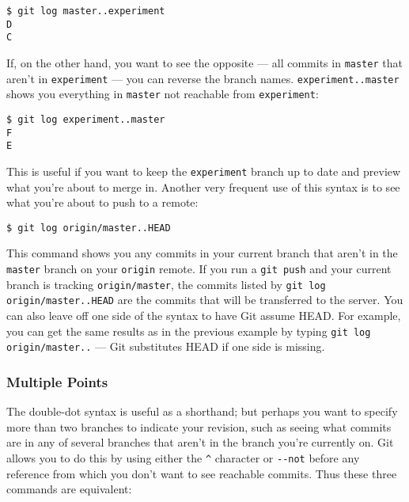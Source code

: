 \documentclass[a4paper]{book}
\begin{document}
\begin{shaded}\begin{verbatim}
$ git log master..experiment
D
C
\end{verbatim}\end{shaded}

If, on the other hand, you want to see the opposite --- all commits in \texttt{master} that aren't in \texttt{experiment} --- you can reverse the branch names. \texttt{experiment..master} shows you everything in \texttt{master} not reachable from \texttt{experiment}:

\begin{shaded}\begin{verbatim}
$ git log experiment..master
F
E
\end{verbatim}\end{shaded}

This is useful if you want to keep the \texttt{experiment} branch up to date and preview what you're about to merge in. Another very frequent use of this syntax is to see what you're about to push to a remote:

\begin{shaded}\begin{verbatim}
$ git log origin/master..HEAD
\end{verbatim}\end{shaded}

This command shows you any commits in your current branch that aren't in the \texttt{master} branch on your \texttt{origin} remote. If you run a \texttt{git push} and your current branch is tracking \texttt{origin/master}, the commits listed by \texttt{git log origin/master..HEAD} are the commits that will be transferred to the server. You can also leave off one side of the syntax to have Git assume HEAD. For example, you can get the same results as in the previous example by typing \texttt{git log origin/master..} --- Git substitutes HEAD if one side is missing.

\subsubsection{Multiple Points}

The double-dot syntax is useful as a shorthand; but perhaps you want to specify more than two branches to indicate your revision, such as seeing what commits are in any of several branches that aren't in the branch you're currently on. Git allows you to do this by using either the \texttt{\^{}} character or \texttt{-{}-not} before any reference from which you don't want to see reachable commits. Thus these three commands are equivalent:
\end{document}
